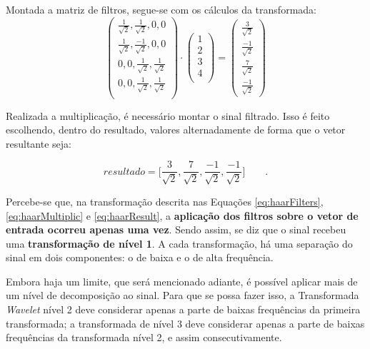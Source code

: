 			\par Montada a matriz de filtros, segue-se com os cálculos da transformada:
			\begin{equation}
				\begin{pmatrix}
					\frac{1}{\sqrt{2}}, \frac{1}{\sqrt{2}}, 0, 0\\
					\frac{1}{\sqrt{2}}, \frac{-1}{\sqrt{2}}, 0, 0\\
					0, 0, \frac{1}{\sqrt{2}}, \frac{1}{\sqrt{2}}\\
					0, 0, \frac{1}{\sqrt{2}}, \frac{1}{\sqrt{2}}\\
				\end{pmatrix} 
				\cdot
				\begin{pmatrix}
					1\\
					2\\
					3\\
					4\\
				\end{pmatrix} 
				=
				\begin{pmatrix}
					\frac{3}{\sqrt{2}}\\
					\frac{-1}{\sqrt{2}}\\
					\frac{7}{\sqrt{2}}\\
					\frac{-1}{\sqrt{2}}
				\end{pmatrix}
				\label{eq:haarMultiplic}
			\end{equation}

			\par Realizada a multiplicação, é necessário montar o sinal filtrado. Isso é feito escolhendo, dentro do resultado, valores alternadamente de forma que o vetor resultante seja:
			
			\begin{equation}
				resultado = \Big[
				\frac{3}{\sqrt{2}},
				\frac{7}{\sqrt{2}},
				\frac{-1}{\sqrt{2}},
				\frac{-1}{\sqrt{2}}
				\Big]\qquad.
				\label{eq:haarResult}
			\end{equation}
			
			\par Percebe-se que, na transformação descrita nas Equações \autoref{eq:haarFilters}, \autoref{eq:haarMultiplic} e \autoref{eq:haarResult}, a \textbf{aplicação dos filtros sobre o vetor de entrada ocorreu apenas uma vez}. Sendo assim, se diz que o sinal recebeu uma \textbf{transformação de nível 1}. A cada transformação, há uma separação do sinal em dois componentes: o de baixa e o de alta frequência.
	
			\par Embora haja um limite, que será mencionado adiante, é possível aplicar mais de um nível de decomposição ao sinal. Para que se possa fazer isso, a Transformada \textit{Wavelet} nível 2 deve considerar apenas a parte de baixas frequências da primeira transformada; a transformada de nível 3 deve considerar apenas a parte de baixas frequências da transformada nível 2, e assim consecutivamente.
			
